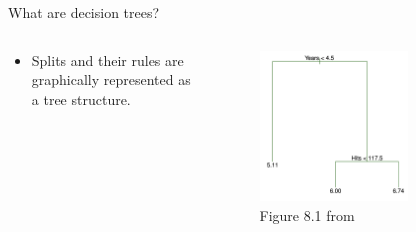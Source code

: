 \documentclass[professionalfonts]{beamer}
\begin{document}
\begin{frame}{What are decision trees?}
  \begin{columns}
    \begin{column}{0.40\linewidth}
      \begin{itemize}
        \item Splits and their rules are graphically represented as a tree structure.
      \end{itemize}
    \end{column}
    \begin{column}{0.60\linewidth}
      \begin{figure}
        \centering
        \includegraphics[width=0.7\textwidth]{images/tree.png}
        \caption{Figure 8.1 from \citet{jamesIntroductionStatisticalLearning2021}}
      \end{figure}
    \end{column}
  \end{columns}
\end{frame}
\end{document}
